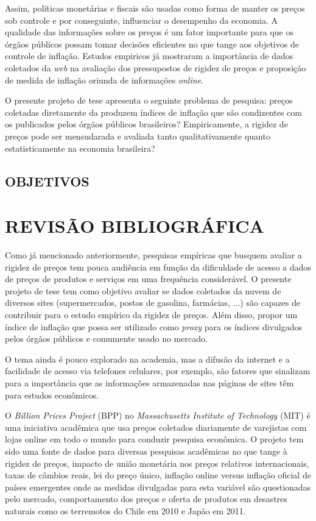 \documentclass[twoside,a4paper,11pt]{report}
\begin{document}
Assim, políticas monetárias e fiscais são usadas como forma de manter os preços sob controle e por conseguinte, influenciar o desempenho da economia. A qualidade das informações sobre os preços é um fator importante para que os órgãos públicos possam tomar decisões eficientes no que tange aos objetivos de controle de inflação. Estudos empiricos já mostraram a importância de dados coletados da \emph{web} na avaliação dos pressupostos de rigidez de preços e proposição de medida de inflação oriunda de informações \emph{online}.

O presente projeto de tese apresenta o seguinte problema de pesquisa: preços coletadas diretamente da  produzem índices de inflação que são condizentes com os publicados pelos órgãos públicos brasileiros? Empiricamente, a rigidez de preços pode ser mensudarada e avaliada tanto qualitativamente quanto estatisticamente na economia brasileira?  


\section*{OBJETIVOS}

\pagestyle{empty}
\cleardoublepage
\pagestyle{fancy}

\chapter{REVISÃO BIBLIOGRÁFICA}\label{cap2}

Como já mencionado anteriormente, pesquisas empíricas que busquem avaliar a rigidez de preços tem pouca audiência em função da dificuldade de acesso a dados de preços de produtos e serviços em uma frequência considerável. O presente projeto de tese tem como objetivo avaliar se dados coletados da nuvem de diversos sites (supermercados, postos de gasolina, farmácias, ...) são capazes de contribuir para o estudo empírico da rigidez de preços. Além disso, propor um índice de inflação que possa ser utilizado como \emph{proxy} para os índices divulgados pelos órgãos públicos e comumente usado no mercado.  

O tema ainda é pouco explorado na academia, mas a difusão da internet e a facilidade de acesso via telefones celulares, por exemplo, são fatores que sinalizam para a importância que as informações armazenadas nas páginas de sites têm para estudos econômicos. 

O \emph{Billion Prices Project} (BPP) no \emph{Massachusetts Institute of Technology} (MIT) é uma iniciativa acadêmica que usa preços coletados diariamente de varejistas com lojas online em todo o mundo para conduzir pesquisa econômica. O projeto tem sido uma fonte de dados para diversas pesquisas acadêmicas no que tange à rigidez de preços, impacto de união monetária nos preços relativos internacionais, taxas de câmbios reais, lei do preço único, inflação online versus inflação oficial de países emergentes onde as medidas divulgadas para esta variável são questionadas pelo mercado, comportamento dos preços e oferta de produtos em desastres naturais como os terremotos do Chile em 2010 e Japão em 2011.
\end{document}
